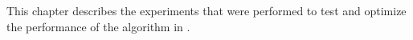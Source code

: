 This chapter describes
  the experiments that were performed
  to test and optimize
  the performance of the \corn algorithm in \dsea.
